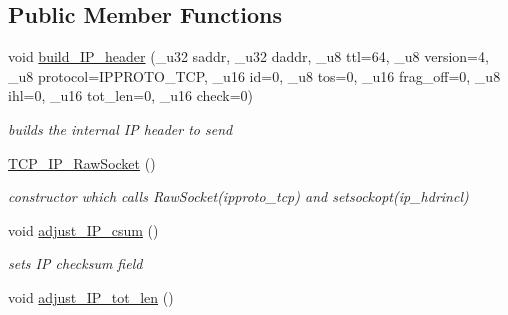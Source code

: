 \subsection*{Public Member Functions}
\begin{CompactItemize}
\item 
\hypertarget{classsocketpp_1_1TCP__IP__RawSocket_10edb8c09e89f09c0b99b5b2febce821}{
void \hyperlink{classsocketpp_1_1TCP__IP__RawSocket_10edb8c09e89f09c0b99b5b2febce821}{build\_\-IP\_\-header} (\_\-u32 saddr, \_\-u32 daddr, \_\-u8 ttl=64, \_\-u8 version=4, \_\-u8 protocol=IPPROTO\_\-TCP, \_\-u16 id=0, \_\-u8 tos=0, \_\-u16 frag\_\-off=0, \_\-u8 ihl=0, \_\-u16 tot\_\-len=0, \_\-u16 check=0)}
\label{classsocketpp_1_1TCP__IP__RawSocket_10edb8c09e89f09c0b99b5b2febce821}

\begin{CompactList}\small\item\em builds the internal IP header to send \item\end{CompactList}\item 
\hypertarget{classsocketpp_1_1TCP__IP__RawSocket_1b08f12274fd9590f805bc876c44edd9}{
\hyperlink{classsocketpp_1_1TCP__IP__RawSocket_1b08f12274fd9590f805bc876c44edd9}{TCP\_\-IP\_\-RawSocket} ()}
\label{classsocketpp_1_1TCP__IP__RawSocket_1b08f12274fd9590f805bc876c44edd9}

\begin{CompactList}\small\item\em constructor which calls RawSocket(ipproto\_\-tcp) and setsockopt(ip\_\-hdrincl) \item\end{CompactList}\item 
\hypertarget{classsocketpp_1_1TCP__IP__RawSocket_cabdd9a217d59c0c2c5511e01c222427}{
void \hyperlink{classsocketpp_1_1TCP__IP__RawSocket_cabdd9a217d59c0c2c5511e01c222427}{adjust\_\-IP\_\-csum} ()}
\label{classsocketpp_1_1TCP__IP__RawSocket_cabdd9a217d59c0c2c5511e01c222427}

\begin{CompactList}\small\item\em sets IP checksum field \item\end{CompactList}\item 
\hypertarget{classsocketpp_1_1TCP__IP__RawSocket_e9c3cfe3d011cbf85653240aa30f3f17}{
void \hyperlink{classsocketpp_1_1TCP__IP__RawSocket_e9c3cfe3d011cbf85653240aa30f3f17}{adjust\_\-IP\_\-tot\_\-len} ()}
\label{classsocketpp_1_1TCP__IP__RawSocket_e9c3cfe3d011cbf85653240aa30f3f17}


\end{CompactItemize}
